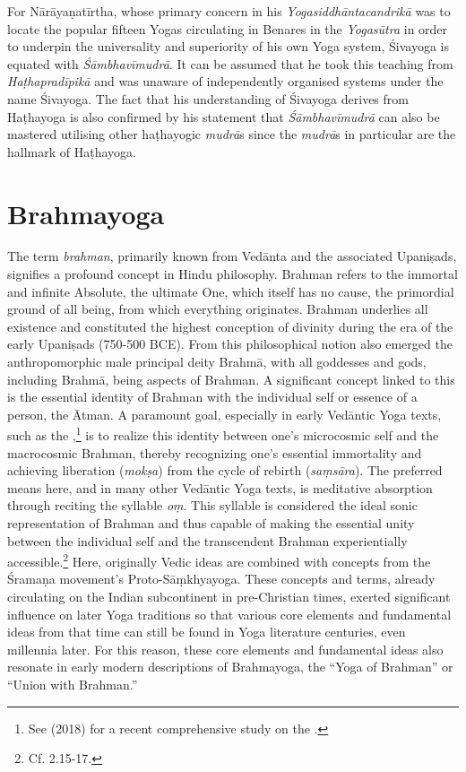 For Nārāyaṇatīrtha, whose primary concern in his \emph{Yogasiddhāntacandrikā} was to locate the popular fifteen Yogas circulating in Benares in the \emph{Yogasūtra} in order to underpin the universality and superiority of his own Yoga system, Śivayoga is equated with \emph{Śāmbhavīmudrā}. It can be assumed that he took this teaching from \emph{Haṭhapradīpikā} and was unaware of independently organised systems under the name Śivayoga. The fact that his understanding of Śivayoga derives from Haṭhayoga is also confirmed by his statement that \emph{Śāmbhavīmudrā} can also be mastered utilising other haṭhayogic \textit{mudrā}s since the \emph{mudrā}s in particular are the hallmark of Haṭhayoga.

\section{Brahmayoga}
\label{brahmayogaintro}

The term \emph{brahman}, primarily known from Vedānta and the associated Upaniṣads, signifies a profound concept in Hindu philosophy. Brahman refers to the immortal and infinite Absolute, the ultimate One, which itself has no cause, the primordial ground of all being, from which everything originates. Brahman underlies all existence and constituted the highest conception of divinity during the era of the early Upaniṣads (750-500 BCE). From this philosophical notion also emerged the anthropomorphic male principal deity Brahmā, with all goddesses and gods, including Brahmā, being aspects of Brahman. A significant concept linked to this is the essential identity of Brahman with the individual self or essence of a person, the Ātman. A paramount goal, especially in early Vedāntic Yoga texts, such as the ,\footnote{See \citeauthor{haas2018vom} (2018) for a recent comprehensive study on the .} is to realize this identity between one's microcosmic self and the macrocosmic Brahman, thereby recognizing one's essential immortality and achieving liberation (\textit{mokṣa}) from the cycle of rebirth (\textit{saṃsāra}). The preferred means here, and in many other Vedāntic Yoga texts, is meditative absorption through reciting the syllable \textit{oṃ}. This syllable is considered the ideal sonic representation of Brahman and thus capable of making the essential unity between the individual self and the transcendent Brahman experientially accessible.\footnote{Cf.  2.15-17.} Here, originally Vedic ideas are combined with concepts from the Śramaṇa movement's Proto-Sāṃkhyayoga. These concepts and terms, already circulating on the Indian subcontinent in pre-Christian times, exerted significant influence on later Yoga traditions so that various core elements and fundamental ideas from that time can still be found in Yoga literature centuries, even millennia later. For this reason, these core elements and fundamental ideas also resonate in early modern descriptions of Brahmayoga, the ``Yoga of Brahman'' or ``Union with Brahman.''


